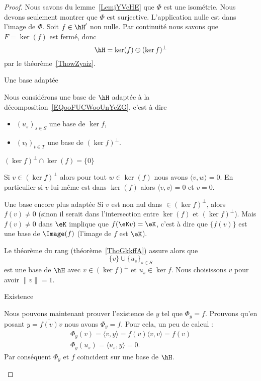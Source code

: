 \begin{proof}
    Nous savons du lemme~\ref{LemjYVcHE} que \(\Phi\) est une isométrie. Nous devons seulement montrer que \( \Phi\) est surjective. L'application nulle est dans l'image de \( \Phi\). Soit \( f\in \hH'\) non nulle. Par continuité nous savons que \( F=\ker(f)\) est fermé, donc
    \begin{equation}    \label{EQooFUCWooUnYcZG}
        \hH=\ker(f)\oplus(\ker f)^{\perp}
    \end{equation}
    par le théorème~\ref{ThowZyaiz}.

    \begin{subproof}
        \item[Une base adaptée]

            Nous considérons une base de \( \hH\) adaptée à la décomposition~\ref{EQooFUCWooUnYcZG}, c'est à dire
    \begin{itemize}
        \item \( (u_s)_{s\in S}\) une base de \( \ker f\),
        \item
            \( (v_t)_{t\in T}\) une base de \( (\ker f)^{\perp}\).
    \end{itemize}

\item[\( (\ker f)^{\perp}\cap\ker(f)=\{ 0 \}  \)]

    Si \( v\in (\ker f)^{\perp}\) alors pour tout \( w\in \ker(f)\) nous avons \( \langle v, w\rangle =0\). En particulier si \( v\) lui-même est dans \( \ker(f)\) alors \( \langle v, v\rangle =0\) et \( v=0\).

\item[Une base encore plus adaptée]
    Si \( v\) est non nul dans \( \in (\ker f)^{\perp}\), alors \( f(v)\neq 0\) (sinon il serait dans l'intersection entre \( \ker(f)\) et \( (\ker f)^{\perp}\)). Mais \( f(v)\neq 0\) dans \( \eK\) implique que \( f(\eK v)=\eK\), c'est à dire que \( \{ f(v) \}\) est une base de \( \Image(f)\) (l'image de \( f\) est \( \eK\)).

    Le théorème du rang (théorème~\ref{ThoGkkffA}) assure alors que
    \begin{equation}
        \{ v \}\cup\{ u_s \}_{s\in S}
    \end{equation}
    est une base de \( \hH\) avec \( v\in(\ker f)^{\perp}\) et \( u_s\in \ker f\). Nous choisissons \( v\) pour avoir \( \| v \|=1\).

\item[Existence]

    Nous pouvons maintenant prouver l'existence de \( y\) tel que \(  \Phi_y= f\). Prouvons qu'en posant \( y=\overline{  f(v) }v\) nous avons \(  \Phi_y= f\). Pour cela, un peu de calcul :
    \begin{subequations}
        \begin{align}
             \Phi_y(v)=\langle v, y\rangle = f(v)\langle v, v\rangle = f(v)\\
             \Phi_y(u_s)=\langle u_s, y\rangle =0.
        \end{align}
    \end{subequations}
    Par conséquent \(  \Phi_y\) et \(  f\) coïncident sur une base de \( \hH\).


\end{subproof}
\end{proof}
